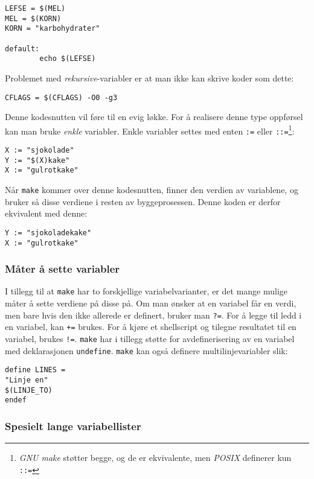 \begin{alphasection}
\begin{lstlisting}
LEFSE = $(MEL)
MEL = $(KORN)
KORN = "karbohydrater"

default:
        echo $(LEFSE)
\end{lstlisting}

Problemet med \textit{rekursive}-variabler er at man ikke kan skrive koder som dette:

\begin{lstlisting}
CFLAGS = $(CFLAGS) -O0 -g3
\end{lstlisting}
Denne kodesnutten vil føre til en evig løkke. For å realisere denne type oppførsel kan man bruke \textit{enkle} variabler. Enkle variabler settes med enten \verb|:=| eller \verb|::=|\footnote{\textit{GNU make} støtter begge, og de er ekvivalente, men \textit{POSIX} definerer kun \texttt{::=}}:
\begin{lstlisting}
X := "sjokolade"
Y := "$(X)kake"
X := "gulrotkake"
\end{lstlisting}

Når \verb|make| kommer over denne kodesnutten, finner den verdien av variablene, og bruker så disse verdiene i resten av byggeprosessen. Denne koden er derfor ekvivalent med denne:

\begin{lstlisting}
Y := "sjokoladekake"
X := "gulrotkake"
\end{lstlisting}

\subsubsection{Måter å sette variabler}

I tillegg til at \verb|make| har to forskjellige variabelvarianter, er det mange mulige måter å sette verdiene på disse på. Om man ønsker at en variabel får en verdi, men bare hvis den ikke allerede er definert, bruker man \verb|?=|. For å legge til ledd i en variabel, kan \verb|+=| brukes. For å kjøre et shellscript og tilegne resultatet til en variabel, brukes \verb|!=|. \verb|make| har i tillegg støtte for avdefinerisering av en variabel med deklarasjonen \verb|undefine|. \verb|make| kan også definere multilinjevariabler slik:

\begin{lstlisting}
define LINES =
"Linje en"
$(LINJE_TO)
endef
\end{lstlisting}

\subsubsection{Spesielt lange variabellister}


\end{alphasection}
